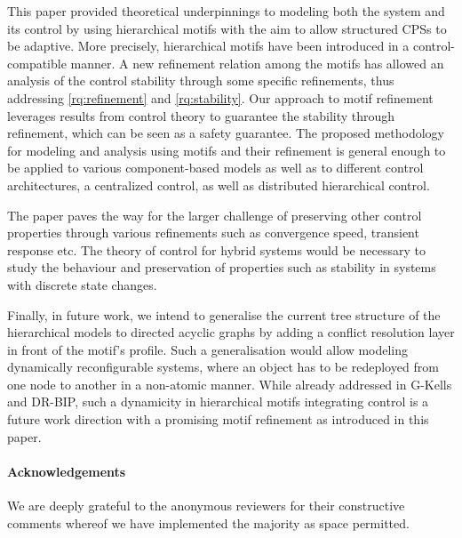 \documentclass[runningheads]{llncs}
\makeatletter
\newcommand{\etc}[1][\@ ]{etc.{#1}}
\makeatother
\begin{document}
This paper provided theoretical underpinnings to modeling both the system and its control by using hierarchical motifs with the aim to allow structured CPSs to be adaptive. More precisely, hierarchical motifs have been introduced in a control-compatible manner. A new refinement relation among the motifs has allowed an analysis of the control stability through some specific refinements, thus addressing \ref{rq:refinement} and \ref{rq:stability}. 
Our approach to motif refinement leverages results from control theory to guarantee the stability through refinement, which can be seen as a safety guarantee. The proposed methodology for modeling and analysis using motifs and their refinement is general enough to be applied to various component-based models as well as to different control architectures, a centralized control, as well as distributed hierarchical control. 

The paper paves the way for the larger challenge of preserving other control properties through various refinements such as convergence speed, transient response \etc  
The theory of control for hybrid systems would be necessary to study the behaviour and preservation of properties such as stability in systems with discrete state changes. 

Finally, in future work, we intend to generalise the current tree structure of the hierarchical models  
to directed acyclic graphs by adding a conflict resolution layer in front of the motif's profile. Such a generalisation would allow modeling dynamically reconfigurable systems, where an object has to be redeployed from one node to another in a non-atomic manner. 
While already addressed in G-Kells and DR-BIP, such a dynamicity in hierarchical motifs integrating control is a future work direction with a promising motif refinement as introduced in this paper.

\paragraph*{Acknowledgements}
We are deeply grateful to the anonymous reviewers for their constructive comments whereof we have implemented the majority as space permitted.



\end{document}
